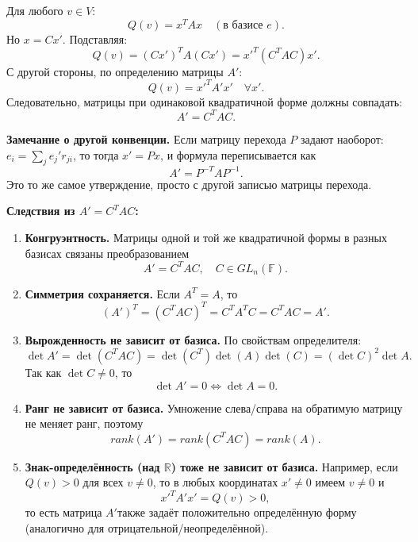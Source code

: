 \documentclass[14pt]{extreport}
\begin{document}
    \begin{prbox}
        Для любого $v \in V$:
        \[
        Q(v) = x^TAx \quad (\text{в базисе $e$}).
        \]
        Но $x = Cx'$. Подставляя:
        \[
        Q(v) = (Cx')^T A (Cx') = x'^T (C^TAC) x'.
        \]
        С другой стороны, по определению матрицы $A'$:
        \[
        Q(v) = x'^TA'x' \quad \forall x'.
        \]
        Следовательно, матрицы при одинаковой квадратичной форме должны совпадать:
        \[
        A' = C^TAC.
        \]
    \end{prbox}

    \begin{impbox}
        \textbf{Замечание о другой конвенции.} Если матрицу перехода $P$ задают наоборот: $e_i = \sum_j e_j' r_{ji}$, то тогда $x' = Px$, и формула переписывается как
        \[
        A' = P^{-T} A P^{-1}.
        \]
        Это то же самое утверждение, просто с другой записью матрицы перехода.
    \end{impbox}

    \begin{defbox}
        \textbf{Следствия из $A' = C^TAC$:}
        \begin{enumerate}
            \item \textbf{Конгруэнтность.} Матрицы одной и той же квадратичной формы в разных базисах связаны преобразованием
            \[
            A' = C^TAC, \quad C \in GL_n(\mathbb{F}).
            \]

            \item \textbf{Симметрия сохраняется.} Если $A^T = A$, то
            \[
            (A')^T = (C^TAC)^T = C^TA^TC = C^TAC = A'.
            \]

            \item \textbf{Вырожденность не зависит от базиса.} По свойствам определителя:
            \[
            \det A' = \det(C^TAC) = \det(C^T) \det(A) \det(C) = (\det C)^2 \det A.
            \]
            Так как $\det C \neq 0$, то
            \[
            \det A' = 0 \Leftrightarrow \det A = 0.
            \]

            \item \textbf{Ранг не зависит от базиса.} Умножение слева/справа на обратимую матрицу не меняет ранг, поэтому
            \[
            rank(A') = rank(C^TAC) = rank(A).
            \]

            \item \textbf{Знак-определённость (над $\mathbb{R}$) тоже не зависит от базиса.} Например, если $Q(v) > 0$ для всех $v \neq 0$, то в любых координатах $x' \neq 0$ имеем $v \neq 0$ и
            \[
            x'^T A' x' = Q(v) > 0,
            \]
            то есть матрица $A'$также задаёт положительно определённую форму (аналогично для отрицательной/неопределённой).
        \end{enumerate}
    \end{defbox}
\end{document}
